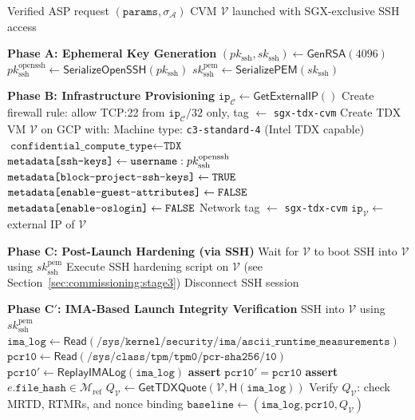 \begin{algorithm}[t]
\caption{CVM Commissioning Protocol (executed inside $\mathcal{C}$)}
\label{alg:commissioning}
\begin{algorithmic}[1]
\Require Verified ASP request $(\texttt{params}, \sigma_\mathcal{A})$
\Ensure CVM $\mathcal{V}$ launched with SGX-exclusive SSH access

\Statex \textbf{Phase A: Ephemeral Key Generation}
\State $(pk_{\text{ssh}}, sk_{\text{ssh}}) \leftarrow \textsf{GenRSA}(4096)$ 
\State $pk_{\text{ssh}}^{\text{openssh}} \leftarrow \textsf{SerializeOpenSSH}(pk_{\text{ssh}})$
\State $sk_{\text{ssh}}^{\text{pem}} \leftarrow \textsf{SerializePEM}(sk_{\text{ssh}})$ 

\Statex
\Statex \textbf{Phase B: Infrastructure Provisioning}
\State $\texttt{ip}_\mathcal{C} \leftarrow \textsf{GetExternalIP}()$ 
\State Create firewall rule: allow TCP:22 from $\texttt{ip}_\mathcal{C}/32$ only, tag $\leftarrow$ \texttt{sgx-tdx-cvm}
\State Create TDX VM $\mathcal{V}$ on GCP with:
\State \quad Machine type: \texttt{c3-standard-4} (Intel TDX capable)
\State \quad $\texttt{confidential\_compute\_type} \leftarrow \texttt{TDX}$
\State \quad $\texttt{metadata[ssh\text{-}keys]} \leftarrow \texttt{username}:pk_{\text{ssh}}^{\text{openssh}}$
\State \quad $\texttt{metadata[block\text{-}project\text{-}ssh\text{-}keys]} \leftarrow \texttt{TRUE}$
\State \quad $\texttt{metadata[enable\text{-}guest\text{-}attributes]} \leftarrow \texttt{FALSE}$
\State \quad $\texttt{metadata[enable\text{-}oslogin]} \leftarrow \texttt{FALSE}$
\State \quad Network tag $\leftarrow$ \texttt{sgx-tdx-cvm}
\State $\texttt{ip}_\mathcal{V} \leftarrow$ external IP of $\mathcal{V}$

\Statex
\Statex \textbf{Phase C: Post-Launch Hardening (via SSH)}
\State Wait for $\mathcal{V}$ to boot
\State SSH into $\mathcal{V}$ using $sk_{\text{ssh}}^{\text{pem}}$
\State Execute SSH hardening script on $\mathcal{V}$ (see Section~\ref{sec:commissioning:stage3})
\State Disconnect SSH session

\Statex
\Statex \textbf{Phase C$'$: IMA-Based Launch Integrity Verification}
\State SSH into $\mathcal{V}$ using $sk_{\text{ssh}}^{\text{pem}}$
\State $\texttt{ima\_log} \leftarrow \textsf{Read}(\texttt{/sys/kernel/security/ima/ascii\_runtime\_measurements})$
\State $\texttt{pcr10} \leftarrow \textsf{Read}(\texttt{/sys/class/tpm/tpm0/pcr-sha256/10})$
\State $\texttt{pcr10}' \leftarrow \textsf{ReplayIMALog}(\texttt{ima\_log})$ 
\State \textbf{assert} $\texttt{pcr10}' = \texttt{pcr10}$ 
    \State \textbf{assert} $e.\texttt{file\_hash} \in \mathcal{M}_{\text{ref}}$ 
\EndFor
\State $Q_\mathcal{V} \leftarrow \textsf{GetTDXQuote}(\mathcal{V}, \textsf{H}(\texttt{ima\_log}))$ 
\State Verify $Q_\mathcal{V}$: check MRTD, RTMRs, and nonce binding
\State $\texttt{baseline} \leftarrow (\texttt{ima\_log}, \texttt{pcr10}, Q_\mathcal{V})$ 


\end{algorithmic}
\end{algorithm}

